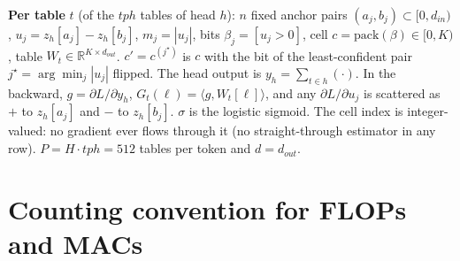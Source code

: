 \documentclass[10pt]{article}
\begin{document}
\textbf{Per table} $t$ (of the $tph$ tables of head $h$): $n$ fixed anchor pairs $(a_j,b_j)\subset[0,d_{in})$,
$u_j=z_h[a_j]-z_h[b_j]$, $m_j=|u_j|$, bits $\beta_j=[u_j>0]$, cell $c=\mathrm{pack}(\beta)\in[0,K)$,
table $W_t\in\mathbb R^{K\times d_{out}}$. $c'=c^{(j^\star)}$ is $c$ with the bit of the least-confident pair
$j^\star=\arg\min_j|u_j|$ flipped. The head output is $y_h=\sum_{t\in h}(\cdot)$.
In the backward, $g=\partial L/\partial y_h$, $G_t(\ell)=\langle g,W_t[\ell]\rangle$, and any
$\partial L/\partial u_j$ is scattered as $+$ to $z_h[a_j]$ and $-$ to $z_h[b_j]$. $\sigma$ is the logistic sigmoid.
The cell index is integer-valued: no gradient ever flows through it (no straight-through estimator in any row).
$P=H\cdot tph=512$ tables per token and $d=d_{out}$.

\section*{Counting convention for FLOPs and MACs}
\end{document}

